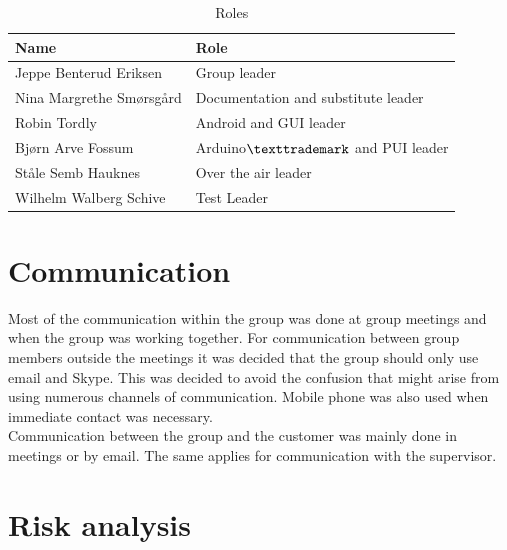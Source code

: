 \begin{table}
\begin{tabular}{|l|l|}
\hline
	{\bf Name} & {\bf Role}\\
\hline
	Jeppe Benterud Eriksen & Group leader\\
\hline
	Nina Margrethe Smørsgård & Documentation and substitute leader\\
\hline
	Robin Tordly & Android and GUI leader\\
\hline
	Bjørn Arve Fossum & Arduino$\texttrademark$ and PUI leader\\
\hline
	Ståle Semb Hauknes & Over the air leader\\
\hline
	Wilhelm Walberg Schive & Test Leader\\
\hline
\end{tabular}
\caption{Roles}
\end{table}

\section{Communication}
Most of the communication within the group was done at group meetings and when the group was working together. For communication between group members outside the meetings it was decided that the group should only use email and Skype. This was decided to avoid the confusion that might arise from using numerous channels of communication. Mobile phone was also used when immediate contact was necessary.\\
\newline
Communication between the group and the customer was mainly done in meetings or by email. The same applies for communication with the supervisor.

\section{Risk analysis}

